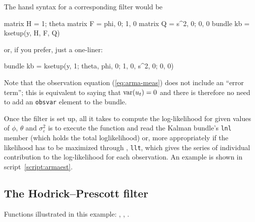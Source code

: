 The \textsf{hansl} syntax for a corresponding filter would be
\begin{code}
matrix H = {1; theta}
matrix F = {phi, 0; 1, 0}
matrix Q = {s^2, 0; 0, 0}
bundle kb = ksetup(y, H, F, Q)
\end{code}
%
or, if you prefer, just a one-liner:
\begin{code}
bundle kb = ksetup(y, {1; theta}, {phi, 0; 1, 0}, {s^2, 0; 0, 0})
\end{code}

Note that the observation equation (\ref{eq:arma-meas}) does not
include an ``error term''; this is equivalent to saying that
$\mbox{var}(u_t) = 0$ and there is therefore no need to add
an \texttt{obsvar} element to the bundle.

Once the filter is set up, all it takes to compute the log-likelihood
for given values of $\phi$, $\theta$ and $\sigma^2_{\varepsilon}$ is
to execute the  function and read the Kalman
bundle's \texttt{lnl} member (which holds the total loglikelihood)
or, more appropriately if the likelihood has to be maximized through
, \texttt{llt}, which gives the series of individual
contribution to the log-likelihood for each observation. An example is
shown in script~\ref{script:armaest}.

\subsection{The Hodrick--Prescott filter}
\label{sec:example_hp}

Functions illustrated in this example: , ,
.

